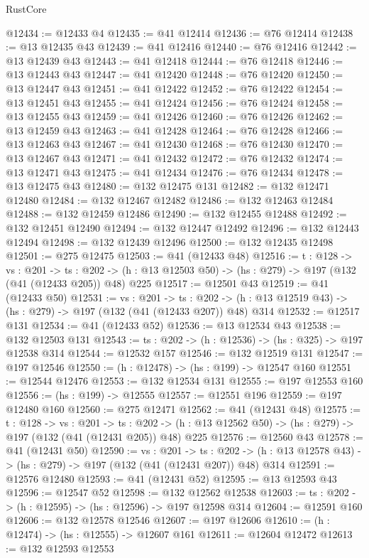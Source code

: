 \begin{lexlean}{RustCore}
\begin{coremodule}
@12434 := @12433 @4
@12435 := @41 @12414
@12436 := @76 @12414
@12438 := @13 @12435 @43
@12439 := @41 @12416
@12440 := @76 @12416
@12442 := @13 @12439 @43
@12443 := @41 @12418
@12444 := @76 @12418
@12446 := @13 @12443 @43
@12447 := @41 @12420
@12448 := @76 @12420
@12450 := @13 @12447 @43
@12451 := @41 @12422
@12452 := @76 @12422
@12454 := @13 @12451 @43
@12455 := @41 @12424
@12456 := @76 @12424
@12458 := @13 @12455 @43
@12459 := @41 @12426
@12460 := @76 @12426
@12462 := @13 @12459 @43
@12463 := @41 @12428
@12464 := @76 @12428
@12466 := @13 @12463 @43
@12467 := @41 @12430
@12468 := @76 @12430
@12470 := @13 @12467 @43
@12471 := @41 @12432
@12472 := @76 @12432
@12474 := @13 @12471 @43
@12475 := @41 @12434
@12476 := @76 @12434
@12478 := @13 @12475 @43
@12480 := @132 @12475 @131
@12482 := @132 @12471 @12480
@12484 := @132 @12467 @12482
@12486 := @132 @12463 @12484
@12488 := @132 @12459 @12486
@12490 := @132 @12455 @12488
@12492 := @132 @12451 @12490
@12494 := @132 @12447 @12492
@12496 := @132 @12443 @12494
@12498 := @132 @12439 @12496
@12500 := @132 @12435 @12498
@12501 := @275 @12475
@12503 := @41 (@12433 @48)
@12516 := {t : @128} ->
  {vs : @201} ->
  {ts : @202} -> (h : @13 @12503 @50) -> (hs : @279) -> @197 (@132 (@41 (@12433 @205)) @48) @225
@12517 := @12501 @43
@12519 := @41 (@12433 @50)
@12531 := {vs : @201} ->
  {ts : @202} -> (h : @13 @12519 @43) -> (hs : @279) -> @197 (@132 (@41 (@12433 @207)) @48) @314
@12532 := @12517 @131
@12534 := @41 (@12433 @52)
@12536 := @13 @12534 @43
@12538 := @132 @12503 @131
@12543 := {ts : @202} -> (h : @12536) -> (hs : @325) -> @197 @12538 @314
@12544 := @12532 @157
@12546 := @132 @12519 @131
@12547 := @197 @12546
@12550 := (h : @12478) -> (hs : @199) -> @12547 @160
@12551 := @12544 @12476
@12553 := @132 @12534 @131
@12555 := @197 @12553 @160
@12556 := (hs : @199) -> @12555
@12557 := @12551 @196
@12559 := @197 @12480 @160
@12560 := @275 @12471
@12562 := @41 (@12431 @48)
@12575 := {t : @128} ->
  {vs : @201} ->
  {ts : @202} -> (h : @13 @12562 @50) -> (hs : @279) -> @197 (@132 (@41 (@12431 @205)) @48) @225
@12576 := @12560 @43
@12578 := @41 (@12431 @50)
@12590 := {vs : @201} ->
  {ts : @202} -> (h : @13 @12578 @43) -> (hs : @279) -> @197 (@132 (@41 (@12431 @207)) @48) @314
@12591 := @12576 @12480
@12593 := @41 (@12431 @52)
@12595 := @13 @12593 @43
@12596 := @12547 @52
@12598 := @132 @12562 @12538
@12603 := {ts : @202} -> (h : @12595) -> (hs : @12596) -> @197 @12598 @314
@12604 := @12591 @160
@12606 := @132 @12578 @12546
@12607 := @197 @12606
@12610 := (h : @12474) -> (hs : @12555) -> @12607 @161
@12611 := @12604 @12472
@12613 := @132 @12593 @12553

\end{coremodule}
\end{lexlean}

